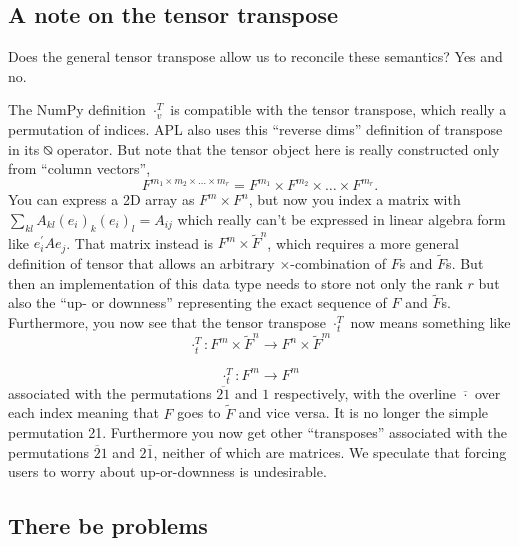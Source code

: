 \subsection{A note on the tensor transpose}

Does the general tensor transpose allow us to reconcile these semantics?
Yes and no.

The NumPy definition $\cdot_{v}^{T}$ is compatible with the tensor
transpose, which really a permutation of indices. APL also uses this
``reverse dims'' definition of transpose in its ⍉ operator. But
note that the tensor object here is really constructed only from ``column
vectors'',
\[
F^{m_{1}\times m_{2}\times\dots\times m_{r}}=F^{m_{1}}\times F^{m_{2}}\times\dots\times F^{m_{r}}.
\]
You can express a 2D array as $F^{m}\times F^{n}$, but now you index
a matrix with $\sum_{kl}A_{kl}\left(e_{i}\right)_{k}\left(e_{i}\right)_{l}=A_{ij}$
which really can't be expressed in linear algebra form like $e_{i}^{\prime}Ae_{j}$.
That matrix instead is $F^{m}\times\tilde{F}^{n}$, which requires
a more general definition of tensor that allows an arbitrary $\times$-combination
of $F$s and $\tilde{F}$s. But then an implementation of this data
type needs to store not only the rank $r$ but also the ``up- or
downness'' representing the exact sequence of $F$ and $\tilde{F}$s.
Furthermore, you now see that the tensor transpose $\cdot_{t}^{T}$
now means something like
\[
\cdot_{t}^{T}:F^{m}\times\tilde{F}^{n}\rightarrow F^{n}\times\tilde{F}^{m}
\]

\[
\cdot_{t}^{T}:F^{m}\rightarrow F^{m}
\]
associated with the permutations $\overline{21}$ and $1$ respectively,
with the overline $\overline{\cdot}$ over each index meaning that
$F$ goes to $\tilde{F}$ and vice versa. It is no longer the simple
permutation 21. Furthermore you now get other ``transposes'' associated
with the permutations $\overline{2}1$ and $2\overline{1}$, neither
of which are matrices. We speculate that forcing users to worry about
up-or-downness is undesirable.


\subsection{There be problems}


